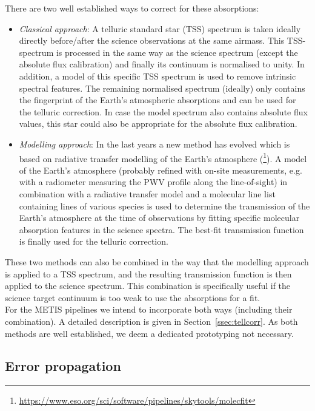 There are two well established ways to correct for these absorptions:
\begin{itemize}
    \item \textit{Classical approach}: A telluric standard star (\ac{TSS}) spectrum is taken ideally directly before/after the science observations at the same airmass. This \ac{TSS}-spectrum is processed in the same way as the science spectrum (except the absolute flux calibration) and finally its continuum is normalised to unity. In addition, a model of this specific \ac{TSS} spectrum is used to remove intrinsic spectral features. The remaining normalised spectrum (ideally) only contains the fingerprint of the Earth's atmospheric absorptions and can be used for the telluric correction. In case the model spectrum also contains absolute flux values, this star could also be appropriate for the absolute flux calibration.
    \item \textit{Modelling approach}: In the last years a new method has evolved which is based on radiative transfer modelling of the Earth's atmosphere (\cite{mf1, mf2, molecfit}\footnote{\url{https://www.eso.org/sci/software/pipelines/skytools/molecfit}}). A model of the Earth's atmosphere (probably refined with on-site measurements, e.g. with a radiometer measuring the \ac{PWV} profile along the line-of-sight) in combination with a radiative transfer model and a molecular line list containing lines of various species is used to determine the transmission of the Earth's atmosphere at the time of observations by fitting specific molecular absorption features in the science spectra. The best-fit transmission function is finally used for the telluric correction.
\end{itemize}
These two methods can also be combined in the way that the modelling approach is applied to a \ac{TSS} spectrum, and the resulting transmission function is then applied to the science spectrum. This combination is specifically useful if the science target continuum is too weak to use the absorptions for a fit.\\
For the \ac{METIS} pipelines we intend to incorporate both ways (including their combination). A detailed description is given in Section~\ref{ssec:tellcorr}. As both methods are well established, we deem a dedicated prototyping not necessary.

\subsection{Error propagation}\label{ssec:criticalerrorpropagation}
\label{Sec:critalg_errorprop}

